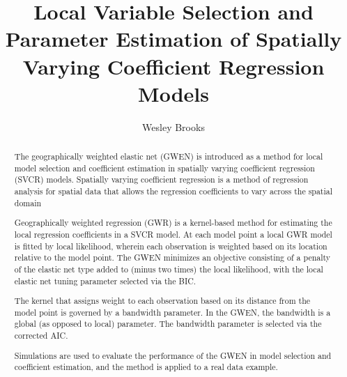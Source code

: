 \documentclass[authoryear, review, 11pt]{elsarticle}
\title{Local Variable Selection and Parameter Estimation of Spatially Varying Coefficient Regression Models}
\author{Wesley Brooks}
\date{}                                           %
\begin{document}
\begin{abstract}
The geographically weighted elastic net (GWEN) is introduced as a method for local model selection and coefficient estimation in spatially varying coefficient regression (SVCR) models. Spatially varying coefficient regression is a method of regression analysis for spatial data that allows the regression coefficients to vary across the spatial domain

Geographically weighted regression (GWR) is a kernel-based method for estimating the local regression coefficients in a SVCR model. At each model point a local GWR model is fitted by local likelihood, wherein each observation is weighted based on its location relative to the model point. The GWEN minimizes an objective consisting of a penalty of the elastic net type added to (minus two times) the local likelihood, with the local elastic net tuning parameter selected via the BIC.

The kernel that assigns weight to each observation based on its distance from the model point is governed by a bandwidth parameter. In the GWEN, the bandwidth is a global (as opposed to local) parameter. The bandwidth parameter is selected via the corrected AIC.

Simulations are used to evaluate the performance of the GWEN in model selection and coefficient estimation, and the method is applied to a real data example.
\end{abstract}

\maketitle


\end{document}
